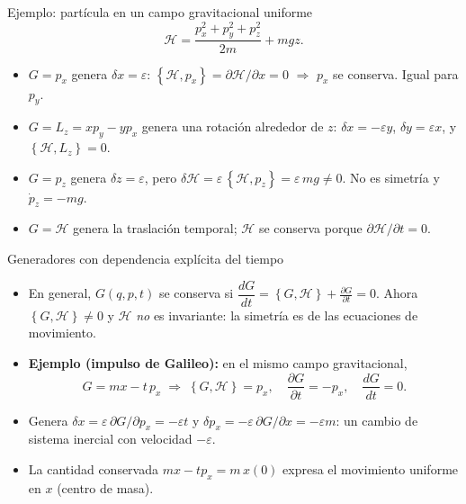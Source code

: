 \documentclass[spanish]{beamer}
\newcommand{\Ham}{\mathcal{H}}
\newcommand{\pd}[2]{\frac{\partial #1}{\partial #2}}
\newcommand{\pb}[2]{\left\{#1,#2\right\}}   %
\begin{document}
\begin{frame}{Ejemplo: partícula en un campo gravitacional uniforme}
\[
  \Ham = \frac{p_x^2 + p_y^2 + p_z^2}{2m} + mgz .
\]
\begin{itemize}
  \item<2-> $G = p_x$ genera $\delta x = \varepsilon$:
        $\pb{\Ham}{p_x} = \partial\Ham/\partial x = 0$ $\Rightarrow$ $p_x$ se conserva.
        Igual para $p_y$.
  \item<3-> $G = L_z = xp_y - yp_x$ genera una rotación alrededor de $z$:
        $\delta x = -\varepsilon y$, $\delta y = \varepsilon x$, y $\pb{\Ham}{L_z} = 0$.
  \item<4-> $G = p_z$ genera $\delta z = \varepsilon$, pero
        $\delta\Ham = \varepsilon\,\pb{\Ham}{p_z} = \varepsilon\,mg\neq 0$.
        No es simetría y $\dot p_z = -mg$.
  \item<5-> $G = \Ham$ genera la traslación temporal; $\Ham$ se conserva porque
        $\partial\Ham/\partial t = 0$.
\end{itemize}
\end{frame}

\begin{frame}{Generadores con dependencia explícita del tiempo}
\begin{itemize}
  \item<1-> En general, $G(q,p,t)$ se conserva si
        $\dfrac{dG}{dt} = \pb{G}{\Ham} + \pd{G}{t} = 0$. Ahora
        $\pb{G}{\Ham}\neq 0$ y $\Ham$ \emph{no} es invariante: la simetría es de
        las ecuaciones de movimiento.
  \item<2-> \textbf{Ejemplo (impulso de Galileo):} en el mismo campo gravitacional,
  \[
    G = m x - t\,p_x
    \;\Rightarrow\;
    \pb{G}{\Ham} = p_x, \quad \pd{G}{t} = -p_x, \quad \frac{dG}{dt} = 0 .
  \]
  \item<3-> Genera $\delta x = \varepsilon\,\partial G/\partial p_x = -\varepsilon t$
        y $\delta p_x = -\varepsilon\,\partial G/\partial x = -\varepsilon m$:
        un cambio de sistema inercial con velocidad $-\varepsilon$.
  \item<4-> La cantidad conservada $mx - tp_x = m\,x(0)$ expresa el movimiento
        uniforme en $x$ (centro de masa).
\end{itemize}
\end{frame}

\end{document}
